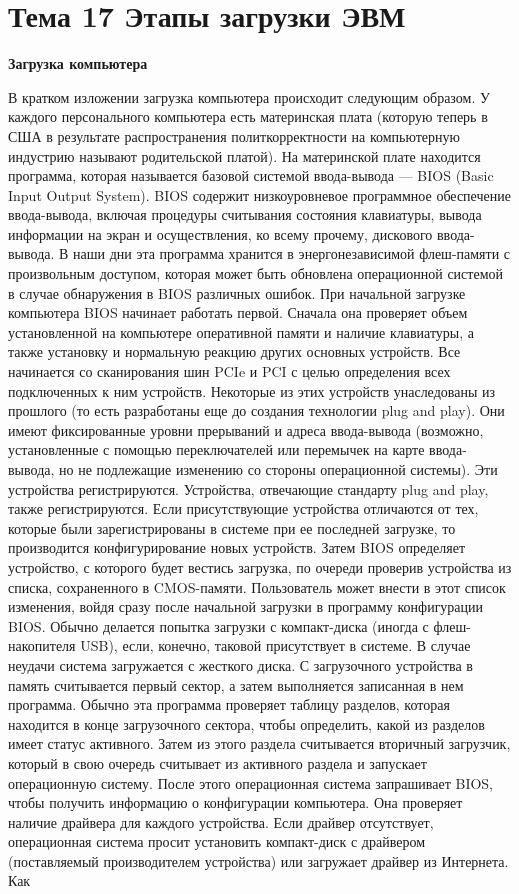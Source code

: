 \newpage 
\chapter{Тема 17 Этапы загрузки ЭВМ}

\begin{center}{\bfseries Загрузка компьютера }
\end{center}
  
В кратком изложении загрузка компьютера происходит следующим образом. У каждого персонального компьютера есть материнская плата (которую теперь в США в результате распространения политкорректности на компьютерную индустрию называют родительской платой). На материнской плате находится программа, которая называется базовой системой ввода-вывода — BIOS (Basic Input Output System). BIOS содержит низкоуровневое программное обеспечение ввода-вывода, включая процедуры считывания состояния клавиатуры, вывода информации на экран и осуществления, ко всему прочему, дискового ввода-вывода. В наши дни эта программа хранится в энергонезависимой флеш-памяти с произвольным доступом, которая может быть обновлена операционной системой в случае обнаружения в BIOS различных ошибок. При начальной загрузке компьютера BIOS начинает работать первой. Сначала она проверяет объем установленной на компьютере оперативной памяти и наличие клавиатуры, а также установку и нормальную реакцию других основных устройств. Все начинается со сканирования шин PCIe и PCI с целью определения всех подключенных к ним устройств. Некоторые из этих устройств унаследованы из прошлого (то есть разработаны еще до создания технологии plug and play). Они имеют фиксированные уровни прерываний и адреса ввода-вывода (возможно, установленные с помощью переключателей или перемычек на карте ввода-вывода, но не подлежащие изменению со стороны операционной системы). Эти устройства регистрируются. Устройства, отвечающие стандарту plug and play, также регистрируются. Если присутствующие устройства отличаются от тех, которые были зарегистрированы в системе при ее последней загрузке, то производится конфигурирование новых устройств. Затем BIOS определяет устройство, с которого будет вестись загрузка, по очереди проверив устройства из списка, сохраненного в CMOS-памяти. Пользователь может внести в этот список изменения, войдя сразу после начальной загрузки в программу конфигурации BIOS. Обычно делается попытка загрузки с компакт-диска (иногда с флеш-накопителя USB), если, конечно, таковой присутствует в системе. В случае неудачи система загружается с жесткого диска. С загрузочного устройства в память считывается первый сектор, а затем выполняется записанная в нем программа. Обычно эта программа проверяет таблицу разделов, которая находится в конце загрузочного сектора, чтобы определить, какой из разделов имеет статус активного. Затем из этого раздела считывается вторичный загрузчик, который в свою очередь считывает из активного раздела и запускает операционную систему. После этого операционная система запрашивает BIOS, чтобы получить информацию о конфигурации компьютера. Она проверяет наличие драйвера для каждого устройства. Если драйвер отсутствует, операционная система просит установить компакт-диск с драйвером (поставляемый производителем устройства) или загружает драйвер из Интернета. Как 